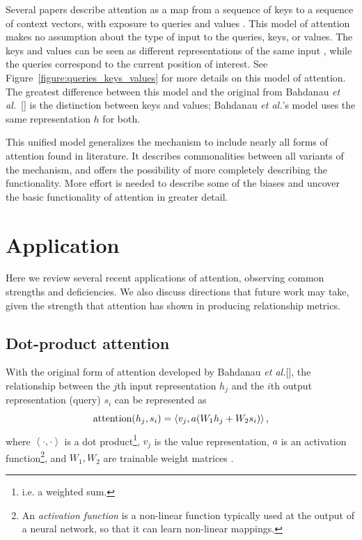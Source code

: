 \documentclass{article}
\newcommand{\etal}{\textit{et al.}}
\begin{document}
Several papers describe attention as a map from a sequence of keys to a sequence of context vectors, with exposure to queries and values \cite{attn_all_you_need,attention_please}. This model of attention makes no assumption about the type of input to the queries, keys, or values. The keys and values can be seen as different representations of the same input \cite{attention_please}, while the queries correspond to the current position of interest. See Figure~\ref{figure:queries_keys_values} for more details on this model of attention. The greatest difference between this model and the original from Bahdanau \etal~[\citeyear{joint_align_translate}] is the distinction between keys and values; Bahdanau \etal's model uses the same representation $h$ for both.

This unified model generalizes the mechanism to include nearly all forms of attention found in literature. It describes commonalities between all variants of the mechanism, and offers the possibility of more completely describing the functionality. More effort is needed to describe some of the biases and uncover the basic functionality of attention in greater detail.

\section{Application}

Here we review several recent applications of attention, observing common strengths and deficiencies. We also discuss directions that future work may take, given the strength that attention has shown in producing relationship metrics.

\subsection{Dot-product attention}

With the original form of attention developed by Bahdanau \etal [\citeyear{joint_align_translate}], the relationship between the $j$th input representation $h_j$ and the $i$th output representation (query) $s_i$ can be represented as
\[
\text{attention}(h_j,s_i)=\left<v_j,a(W_1h_j+W_2s_i)\right>\text,
\]
where $\left<\cdot,\cdot\right>$ is a dot product\footnote{i.e. a weighted sum.}, $v_j$ is the value representation, $a$ is an activation function\footnote{An \textit{activation function} is a non-linear function typically used at the output of a neural network, so that it can learn non-linear mappings.}, and $W_1,W_2$ are trainable weight matrices \cite{massive_exploration}.
\end{document}
